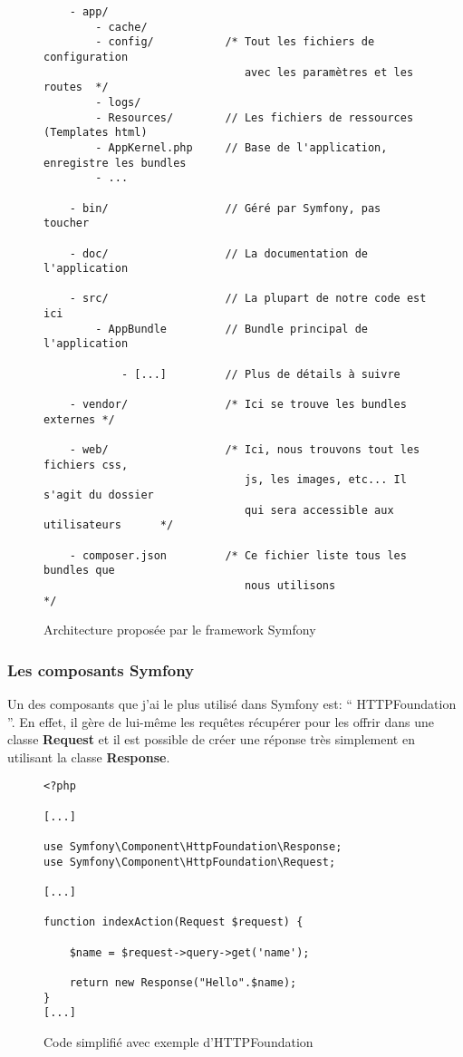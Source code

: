 \begin{figure}[H]
\begin{lstlisting}
    - app/
        - cache/
        - config/           /* Tout les fichiers de configuration
                               avec les paramètres et les routes  */
        - logs/
        - Resources/        // Les fichiers de ressources (Templates html)
        - AppKernel.php     // Base de l'application, enregistre les bundles
        - ...

    - bin/                  // Géré par Symfony, pas toucher

    - doc/                  // La documentation de l'application

    - src/                  // La plupart de notre code est ici
        - AppBundle         // Bundle principal de l'application

            - [...]         // Plus de détails à suivre

    - vendor/               /* Ici se trouve les bundles externes */

    - web/                  /* Ici, nous trouvons tout les fichiers css,
                               js, les images, etc... Il s'agit du dossier
                               qui sera accessible aux utilisateurs      */

    - composer.json         /* Ce fichier liste tous les bundles que 
                               nous utilisons                       */
\end{lstlisting}
\caption{Architecture proposée par le framework Symfony}
\end{figure}

\subsubsection*{Les composants Symfony}

Un des composants que j'ai le plus utilisé dans Symfony est: `` HTTPFoundation ''. En effet, il gère de lui-même les requêtes récupérer pour les offrir dans une classe \textbf{Request} et il est possible de créer une réponse très simplement en utilisant la classe \textbf{Response}.

\begin{figure}[H]
\begin{lstlisting}[frame=single]
<?php

[...]

use Symfony\Component\HttpFoundation\Response;
use Symfony\Component\HttpFoundation\Request;

[...]

function indexAction(Request $request) {

    $name = $request->query->get('name');

    return new Response("Hello".$name);
}
[...]

\end{lstlisting}
\caption{Code simplifié avec exemple d'HTTPFoundation}
\end{figure}


